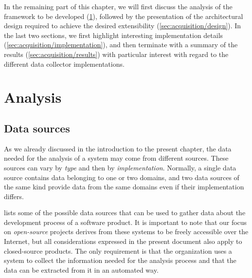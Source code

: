 In the remaining part of this chapter, we will first discuss the analysis of the framework to be
developed (\ref{sec:acquisition/analysis}), followed by the presentation of the architectural design required to achieve the
desired extensibility (\ref{sec:acquisition/design}). In the last two sections, we first highlight interesting implementation
details (\ref{sec:acquisition/implementation}), and then terminate with a summary of the results (\ref{sec:acquisition/results})
with particular interest with regard to the different data collector implementations.


\section{Analysis}
\label{sec:acquisition/analysis}

\subsection{Data sources}
\label{sec:acquisition/analysis/sources}

As we already discussed in the introduction to the present chapter, the data needed for the analysis of a system may come from different sources. These sources can vary by \emph{type} and then by \emph{implementation}. Normally, a single data source contains data belonging to one or two domains, and two data sources of the same kind provide data from the same domains even if their implementation differs.

 lists some of the possible data sources that can be used to gather data about the development process of a software product. It is important to note that our focus on \emph{open-source} projects derives from these systems to be freely accessible over the Internet, but all considerations expressed in the present document also apply to closed-source products. The only requirement is that the organization uses a system to collect the information needed for the analysis process and that the data can be extracted from it in an automated way.

